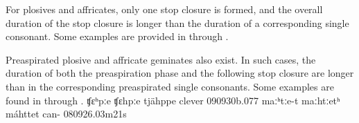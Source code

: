 For plosives and affricates, only one stop closure is formed, and the overall duration of the stop closure is longer than the duration of a corresponding single consonant. Some examples are provided in  through .

Preaspirated plosive and affricate geminates also exist. %
In such cases, the duration of both the preaspiration phase and the following stop closure are longer than in the corresponding preaspirated single consonants. Some examples are found in  through .
		{ʧɛ{ʰpː}e}		{ʧɛ{hpː}e}		{tjähppe}	{clever\BS{}}		{090930b}{.077}
				{maː{ʰtː}e-t}	{maː{htː}etʰ}	{máhttet}	{can-}			{080926}{.03m21s}

